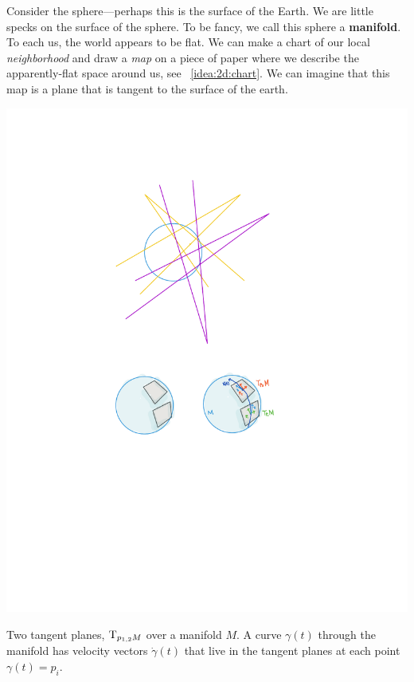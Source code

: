 \documentclass[12pt, oneside]{report}    %
\begin{document}
Consider the sphere---perhaps this is the surface of the Earth. We are little specks on the surface of the sphere. To be fancy, we call this sphere a \textbf{manifold}. To each us, the world appears to be flat. We can make a chart of our local \emph{neighborhood} and draw a \emph{map} on a piece of paper where we describe the apparently-flat space around us, see \bigidearef{}~\ref{idea:2d:chart}. We can imagine that this map is a plane that is tangent to the surface of the earth.
% 
\begin{marginfigure}%
    \includegraphics[width=\textwidth]{figures/TangentBundle.pdf}
    \caption{Two tangent planes, $\textnormal{T}_{p_{1,2}M}$ over a manifold $M$. A curve $\gamma(t)$ through the manifold has velocity vectors $\dot{\gamma}(t)$ that live in the tangent planes at each point $\gamma(t)=p_i$.}
    \label{fig:tangent:bundle:sphere}
\end{marginfigure}
% 
\end{document}
